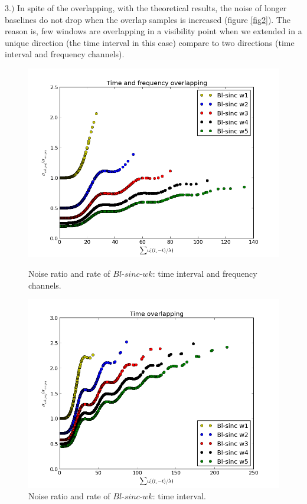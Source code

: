 \documentclass[useAMS,usenatbib]{mn2e}
\begin{document}
$3.)$ In spite of the overlapping, with the theoretical results, the noise of longer baselines do not drop when the overlap 
samples is increased (figure \ref{fig2}). The reason is, few windows are overlapping in a visibility point when we extended in a unique 
direction (the time interval in this case) compare to two directions (time interval and frequency channels).
\begin{figure}
 \centering
\begin{minipage}{0.38\linewidth}\includegraphics[width=1\textwidth]{./Figures/time_freq_ration.png}\caption{Noise ratio and rate 
of $Bl$-$sinc$-$wk$: time interval and frequency channels.}\label{ fig:fig_2a } \end{minipage}
\begin{minipage}{0.38\linewidth}\includegraphics[width=1\textwidth]{./Figures/timeration.png}\caption{Noise ratio and rate of 
$Bl$-$sinc$-$wk$: time interval.}\label{fig:fig_2b}
\end{minipage}
\end{figure} 
\end{document}
